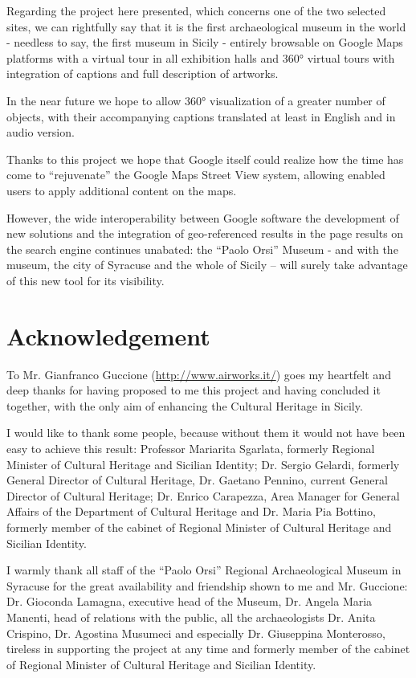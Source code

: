 \documentclass[amsthm,ebook]{saparticle}
\begin{document}
Regarding the project here presented, which concerns one of the two selected sites, we can rightfully say that it is the
first archaeological museum in the world - needless to say, the first museum in Sicily - entirely browsable on Google
Maps platforms with a virtual tour in all exhibition halls and 360° virtual tours with integration of captions and full
description of artworks.

In the near future we hope to allow 360° visualization of a greater number of objects, with their accompanying captions
translated at least in English and in audio version.

Thanks to this project we hope that Google itself could realize how the time has come to ``rejuvenate'' the Google Maps
Street View system, allowing enabled users to apply additional content on the maps.

However, the wide interoperability between Google software the development of new solutions and the integration of
geo-referenced results in the page results on the search engine continues unabated: the ``Paolo Orsi'' Museum - and with
the museum, the city of Syracuse and the whole of Sicily – will surely take advantage of this new tool for its
visibility.






\section*{Acknowledgement}


To Mr. Gianfranco Guccione (\url{http://www.airworks.it/}) goes my heartfelt and deep thanks for having proposed to me this
project and having concluded it together, with the only aim of enhancing the Cultural Heritage in Sicily.

I would like to thank some people, because without them it would not have been easy to achieve this result: Professor
Mariarita Sgarlata, formerly Regional Minister of Cultural Heritage and Sicilian Identity; Dr. Sergio Gelardi, formerly
General Director of Cultural Heritage, Dr. Gaetano Pennino, current General Director of Cultural Heritage; Dr. Enrico
Carapezza, Area Manager for General Affairs of the Department of Cultural Heritage and Dr. Maria Pia Bottino, formerly
member of the cabinet of Regional Minister of Cultural Heritage and Sicilian Identity.

I warmly thank all staff of the ``Paolo Orsi'' Regional Archaeological Museum in Syracuse for the great availability and
friendship shown to me and Mr. Guccione: Dr. Gioconda Lamagna, executive head of the Museum, Dr. Angela Maria Manenti,
head of relations with the public, all the archaeologists Dr. Anita Crispino, Dr. Agostina Musumeci and especially Dr.
Giuseppina Monterosso, tireless in supporting the project at any time and formerly member of the cabinet of Regional
Minister of Cultural Heritage and Sicilian Identity.
\end{document}
